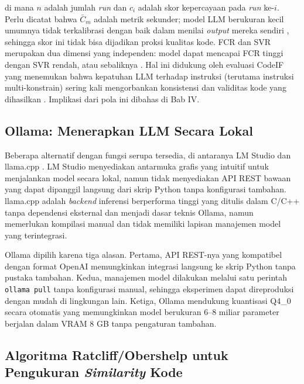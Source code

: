     di mana $n$ adalah jumlah \textit{run} dan $c_i$ adalah skor
    kepercayaan pada \textit{run} ke-$i$. Perlu dicatat bahwa $\bar{C}_m$
    adalah metrik sekunder; model LLM berukuran kecil umumnya tidak
    terkalibrasi dengan baik dalam menilai \textit{output} mereka sendiri
    \cite{akuthota2023vulnerability, li2025iris}, sehingga skor ini
    tidak bisa dijadikan proksi kualitas kode. FCR dan SVR merupakan dua
    dimensi yang independen: model dapat mencapai FCR tinggi dengan SVR
    rendah, atau sebaliknya \cite{zhou2023ifeval}. Hal ini didukung oleh
    evaluasi CodeIF yang menemukan bahwa kepatuhan LLM terhadap instruksi
    (terutama instruksi multi-konstrain) sering kali mengorbankan 
    konsistensi dan validitas kode yang dihasilkan \cite{yan2025codeif}. 
    Implikasi dari pola ini dibahas di Bab IV.

    \subsection{Ollama: Menerapkan LLM Secara Lokal}
    \label{subsec:justifikasi-ollama}

    Beberapa alternatif dengan fungsi serupa tersedia, di antaranya LM Studio
    \cite{elementlabs2024lmstudio} dan llama.cpp \cite{gerganov2023llamacpp}.
    LM Studio menyediakan antarmuka grafis yang intuitif untuk menjalankan
    model secara lokal, namun tidak menyediakan API REST bawaan yang dapat
    dipanggil langsung dari skrip Python tanpa konfigurasi tambahan.
    llama.cpp adalah \textit{backend} inferensi berperforma tinggi yang
    ditulis dalam C/C++ tanpa dependensi eksternal
    \cite{gerganov2023llamacpp} dan menjadi dasar teknis Ollama, namun
    memerlukan kompilasi manual dan tidak memiliki lapisan manajemen model
    yang terintegrasi. 

    Ollama dipilih karena tiga alasan. Pertama, API
    REST-nya yang kompatibel dengan format OpenAI memungkinkan integrasi
    langsung ke skrip Python tanpa pustaka tambahan. Kedua, manajemen model
    dilakukan melalui satu perintah \texttt{ollama pull} tanpa konfigurasi
    manual, sehingga eksperimen dapat direproduksi dengan mudah di lingkungan
    lain. Ketiga, Ollama mendukung kuantisasi Q4\_0 secara otomatis yang
    memungkinkan model berukuran 6--8 miliar parameter berjalan dalam VRAM
    8 GB tanpa pengaturan tambahan.

    \subsection{Algoritma Ratcliff/Obershelp untuk Pengukuran \textit{Similarity} Kode}
\label{subsec:ratcliff-obershelp}

